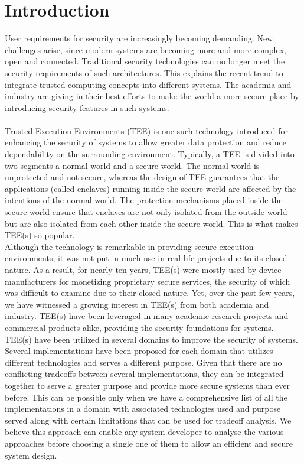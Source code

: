 \documentclass[conference]{IEEEtran}
\begin{document}
\section{Introduction}
User requirements for security are increasingly becoming
demanding. New challenges arise, since modern systems are
becoming more and more complex, open and connected. Traditional security technologies can no longer meet the security
requirements of such architectures. This explains the recent
trend to integrate trusted computing concepts into different
systems. The academia and industry are giving in their best efforts to make the world a more secure place by introducing security features in such systems.\\ \\
Trusted Execution Environments (TEE) \cite{tee} is one such technology introduced for enhancing the security of systems to allow greater data protection and reduce dependability on the surrounding environment. Typically, a TEE is divided into two segments a normal world and a secure world. The normal world is unprotected and not secure, whereas the design of TEE guarantees that the applications (called enclaves) running inside the secure world are affected by the intentions of the normal world. The protection mechanisms placed inside the secure world ensure that enclaves are not only isolated from the outside world but are also isolated from each other inside the secure world. This is what makes TEE(s) so popular. \\

Although the technology is remarkable in providing secure execution environments, it was not put in much use in real life projects due to its closed nature. As a result, for
nearly ten years, TEE(s) were mostly used by device manufacturers for monetizing proprietary
secure services, the security of which was difficult to examine due to their closed nature. Yet, over the past few years, we have witnessed a growing interest in TEE(s) from both
academia and industry. TEE(s) have been leveraged in many academic research projects and
commercial products alike, providing the security foundations for systems.\\

TEE(s) have been utilized in several domains to improve the security of systems. Several implementations have been proposed for each domain that utilizes different technologies and serves a different purpose. Given that there are no conflicting tradeoffs between several implementations, they can be integrated together to serve a greater purpose and provide more secure systems than ever before. This can be possible only when we have a comprehensive list of all the implementations in a domain with associated technologies used and purpose served along with certain limitations that can be used for tradeoff analysis. We believe this approach can enable any system developer to analyse the various approaches before choosing a single one of them to allow an efficient and secure system design.\\
\end{document}
